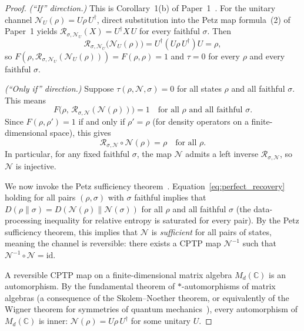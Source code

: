 \documentclass[prl,twocolumn,superscriptaddress,longbibliography]{revtex4-2}
\newcommand{\id}{\mathrm{id}}
\newcommand{\Petz}{\mathcal{R}}
\newcommand{\chan}{\mathcal{N}}
\newcommand{\tauasym}{\tau}
\begin{document}
\begin{proof}
\emph{(``If'' direction.)}
This is Corollary~1(b) of Paper~1~\cite{Huang2026}.  For the
unitary channel $\chan_U(\rho) = U\rho\, U^\dagger$, direct substitution
into the Petz map formula~(2) of Paper~1 yields
$\Petz_{\sigma,\chan_U}(X) = U^\dagger X\, U$ for every faithful
$\sigma$.  Then
\begin{equation}
\Petz_{\sigma,\chan_U}\!\big(\chan_U(\rho)\big)
= U^\dagger(U\rho\, U^\dagger)U = \rho,
\end{equation}
so $F(\rho, \Petz_{\sigma,\chan_U}(\chan_U(\rho))) = F(\rho, \rho) = 1$
and $\tauasym = 0$ for every $\rho$ and every faithful $\sigma$.

\emph{(``Only if'' direction.)}
Suppose $\tauasym(\rho, \chan, \sigma) = 0$ for all states $\rho$
and all faithful $\sigma$.  This means
\begin{equation}
F\!\big(\rho,\, \Petz_{\sigma,\chan}(\chan(\rho))\big) = 1
\quad\text{for all } \rho \text{ and all faithful } \sigma.
\label{eq:perfect_recovery}
\end{equation}
Since $F(\rho, \rho') = 1$ if and only if $\rho' = \rho$
(for density operators on a finite-dimensional space), this gives
\begin{equation}
\Petz_{\sigma,\chan} \circ \chan(\rho) = \rho
\quad\text{for all } \rho.
\end{equation}
In particular, for any fixed faithful $\sigma$, the map $\chan$ admits
a left inverse $\Petz_{\sigma,\chan}$, so $\chan$ is injective.

We now invoke the Petz sufficiency theorem~\cite{Petz1988}.
Equation~\eqref{eq:perfect_recovery} holding for all pairs
$(\rho, \sigma)$ with $\sigma$ faithful implies that
$D(\rho \| \sigma) = D(\chan(\rho) \| \chan(\sigma))$
for all $\rho$ and all faithful $\sigma$ (the data-processing
inequality for relative entropy is saturated for every pair).
By the Petz sufficiency theorem, this implies that $\chan$ is
\emph{sufficient} for all pairs of states, meaning the channel
is reversible: there exists a CPTP map $\chan^{-1}$ such that
$\chan^{-1} \circ \chan = \id$.

A reversible CPTP map on a finite-dimensional matrix algebra
$M_d(\mathbb{C})$ is an automorphism.  By the fundamental theorem
of $*$-automorphisms of matrix algebras (a consequence of the
Skolem--Noether theorem, or equivalently of the Wigner theorem
for symmetries of quantum mechanics~\cite{Wigner1931}),
every automorphism of $M_d(\mathbb{C})$ is inner:
$\chan(\rho) = U\rho\, U^\dagger$ for some unitary $U$.
\end{proof}
\end{document}
